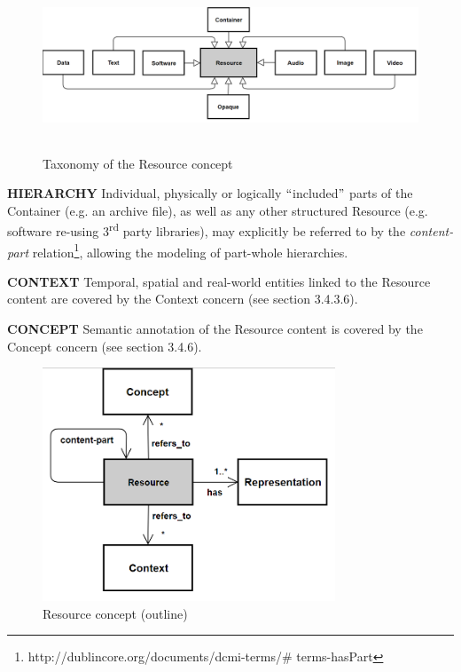 
\begin{figure}[H]
	\begin{Center}
		\includegraphics[width=6.53in,height=2.02in]{./media/image34.png}
		\caption{Taxonomy of the Resource concept}
		\label{fig:Taxonomy_of_the_Resource_concept}
	\end{Center}
\end{figure}





\textbf{HIERARCHY} Individual, physically or logically $``$included$"$  parts of the Container (e.g. an archive file), as well as any other structured Resource (e.g. software re-using 3\textsuperscript{rd} party libraries), may explicitly be referred to by the \textit{content-part} relation\footnote{http://dublincore.org/documents/dcmi-terms/$\#$ terms-hasPart }, allowing the modeling of part-whole hierarchies.

\textbf{CONTEXT} Temporal, spatial and real-world entities linked to the Resource content are covered by the Context concern (see section 3.4.3.6).

\textbf{CONCEPT} Semantic annotation of the Resource content is covered by the Concept concern (see section 3.4.6).




\begin{figure}[H]
	\begin{Center}
		\includegraphics[width=3.44in,height=2.74in]{./media/image35.png}
		\caption{Resource concept (outline)}
		\label{fig:Resource_concept_outline}
	\end{Center}
\end{figure}


